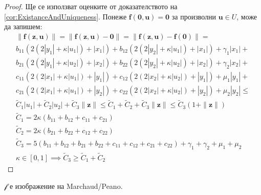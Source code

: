 \begin{proof}
  Ще се използват оценките от доказателството на \eqref{cor:ExistanceAndUniqueness}.
  Понеже $\mathbf{f}(\mathbf{0}, \mathbf{u}) = \mathbf{0}$ за произволни $\mathbf{u} \in U$, може да запишем:
  \begin{multline}
    \|\mathbf{f}(\mathbf{z}, \mathbf{u})\| = \|\mathbf{f}(\mathbf{z}, \mathbf{u}) - \mathbf{0}\| = \|\mathbf{f}(\mathbf{z}, \mathbf{u}) - \mathbf{f}(\mathbf{0})\| = \\
    b_{11} (2 (2 |y_1| + \kappa |u_1|) + |x_1|) + b_{12}(2  (2 |y_2| + \kappa |u_1|) +  |x_1|) + \gamma_1 |x_1| + \\
    b_{21} (2 (2|y_1| + \kappa |u_2|) + |x_2|) + b_{22} (2 (2|y_2| + \kappa |u_2|) + |x_2|) + \gamma_2 |x_2| + \\
    c_{11}(2  (2|x_1| +  \kappa |u_1|) +  |y_1|) + c_{12} (2 (2|x_2| + \kappa |u_2|) + |y_1|) + \mu_1 |y_1| + \\
    c_{21} (2  (2|x_1| + \kappa |u_1|) + |y_2|) + c_{22} (2 (2|x_2| + \kappa |u_2|) + |y_2|) + \mu_2 |y_2| \leq \\
    \tilde{C}_1|u_1| + \tilde{C}_2|u_2| + \tilde{C}_3 \|\mathbf{z}\| \leq \tilde{C}_1 + \tilde{C}_2 + \tilde{C}_3 \|\mathbf{z}\| \leq \tilde{C}_3(1 + \|\mathbf{z}\|) \\
    \tilde{C}_1 = 2 \kappa (b_{11} + b_{12} + c_{11} + c_{21}) \\
    \tilde{C}_2 = 2 \kappa (b_{21} + b_{22} + c_{12} + c_{22}) \\
    \tilde{C}_3 = 5 (b_{11} + b_{12} + b_{21} + b_{22} + c_{11} + c_{12} + c_{21} + c_{22}) + \gamma_1 + \gamma_2 + \mu_1 + \mu_2 \\
    \kappa \in [0, 1] \implies \tilde{C}_3 \geq \tilde{C}_1 + \tilde{C}_2
  \end{multline}
\end{proof}

\begin{proposition}
  \label{prop:Marchaud-Peano}
  $\mathscr{f}$ е изображение на Marchaud/Peano.
\end{proposition}


